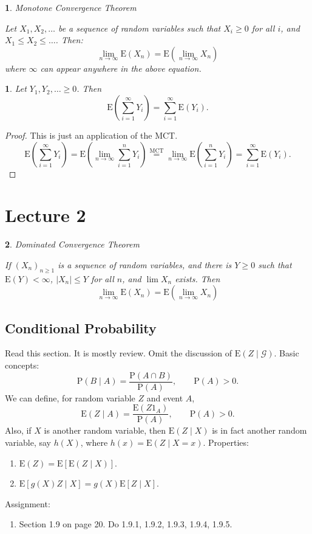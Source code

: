 \documentclass[english,12pt]{article}
\theoremstyle{plain}
\newtheorem*{theorem}{\protect\theoremname}
\newtheorem*{proposition}{\protect\propositionname}
\theoremstyle{definition}
\theoremstyle{definition} %
\newcommand{\thm}[1]{\begin{theorem} #1 \end{theorem} }
\newcommand{\prop}[1]{\begin{proposition} #1 \end{proposition} }
\newcommand{\prf}[1]{\begin{proof} #1 \end{proof} }
\providecommand{\theoremname}{Theorem}
\providecommand{\propositionname}{Proposition}
\begin{document}
\thm{Monotone Convergence Theorem

Let $X_1, X_2, \ldots$ be a sequence of random variables such that $X_i \geq 0$ for all $i$, and $X_1 \leq X_2 \leq \ldots$. Then:
\[ \lim_{n \to \infty} \text{E}(X_n) = \text{E} \left( \lim_{n \to \infty} X_n \right) \]
where $\infty$ can appear anywhere in the above equation.
}

\prop{
Let $Y_1, Y_2, \ldots \geq 0$. Then
\[ \text{E} \left( \sum_{i=1}^\infty Y_i  \right) = \sum_{i=1}^\infty \text{E}(Y_i). \]
}

\prf{
This is just an application of the MCT.
\[ \text{E} \left( \sum_{i=1}^\infty Y_i \right) = \text{E} \left( \lim_{n \to \infty} \sum_{i=1}^n Y_i \right) \overset{\text{MCT}}{=} \lim_{n \to \infty} \text{E} \left( \sum_{i=1}^n Y_i \right) = \sum_{i=1}^\infty \text{E}(Y_i). \]
}


\section*{Lecture 2}

\thm{Dominated Convergence Theorem

If $(X_n)_{n \geq 1}$ is a sequence of random variables, and there is $Y \geq 0$ such that $\text{E}(Y) < \infty$, $|X_n| \leq Y$ for all $n$, and $\lim X_n$ exists. Then
\[ \lim_{n \to \infty} \text{E}(X_n) = \text{E} \left( \lim_{n \to \infty} X_n \right) \]
}

\subsection{Conditional Probability}
Read this section. It is mostly review. Omit the discussion of $\text{E}(Z \mid \mathcal{G})$. Basic concepts:
\[ \text{P}(B \mid A) = \frac{\text{P}(A \cap B)}{\text{P}(A)}, \qquad \text{P}(A) > 0. \]
We can define, for random variable $Z$ and event $A$,
\[ \text{E}(Z \mid A) = \frac{\text{E}(Z 1_A)}{\text{P}(A)}, \qquad \text{P}(A) > 0. \]
Also, if $X$ is another random variable, then $\text{E}(Z \mid X)$ is in fact another random variable, say $h(X)$, where $h(x) = \text{E}(Z \mid X=x)$. Properties:
\begin{enumerate}
\item $\text{E}(Z) = \text{E}[ \text{E}(Z \mid X) ]$.
\item $\text{E}[ g(X) Z \mid X ] = g(X) \text{E}[Z \mid X]$.
\end{enumerate}
Assignment:
\begin{enumerate}
\item Section 1.9 on page 20. Do 1.9.1, 1.9.2, 1.9.3, 1.9.4, 1.9.5.
\end{enumerate}
\end{document}

